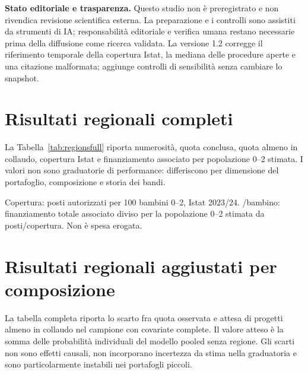 \documentclass[10pt,a4paper]{article}
\begin{document}
\textbf{Stato editoriale e trasparenza.} Questo studio non è preregistrato e non rivendica revisione scientifica esterna. La preparazione e i controlli sono assistiti da strumenti di IA; responsabilità editoriale e verifica umana restano necessarie prima della diffusione come ricerca validata. La versione 1.2 corregge il riferimento temporale della copertura Istat, la mediana delle procedure aperte e una citazione malformata; aggiunge controlli di sensibilità senza cambiare lo snapshot.

\section{Risultati regionali completi}
\label{app:regions}

La Tabella~\ref{tab:regionsfull} riporta numerosità, quota conclusa, quota almeno in collaudo, copertura Istat e finanziamento associato per popolazione 0--2 stimata. I valori non sono graduatorie di performance: differiscono per dimensione del portafoglio, composizione e storia dei bandi.

\begin{table}[H]
\centering
\caption{Risultati per regione, campione ASILI NIDO}
\label{tab:regionsfull}
\resizebox{\textwidth}{!}{}
\begin{minipage}{0.93\linewidth}\footnotesize\color{dvnsgrey}
Copertura: posti autorizzati per 100 bambini 0--2, Istat 2023/24. \texteuro{}/bambino: finanziamento totale associato diviso per la popolazione 0--2 stimata da posti/copertura. Non è spesa erogata.
\end{minipage}
\end{table}

\section{Risultati regionali aggiustati per composizione}

La tabella completa riporta lo scarto fra quota osservata e attesa di progetti almeno in collaudo nel campione con covariate complete. Il valore atteso è la somma delle probabilità individuali del modello pooled senza regione. Gli scarti non sono effetti causali, non incorporano incertezza da stima nella graduatoria e sono particolarmente instabili nei portafogli piccoli.

\begin{table}[H]
\centering
\caption{Maturità osservata e attesa per regione}
\resizebox{0.78\textwidth}{!}{}
\end{table}
\end{document}
